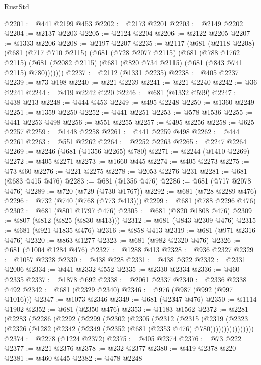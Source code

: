 \begin{lexlean}{RustStd}
\begin{coremodule}
{\begin{coremodule}
{{{{{{{{{{{{{{{{{{{{{{{{{{@2201 := @441 @2199 @453
@2202 := @2173 @2201
@2203 := @2149 @2202
@2204 := @2137 @2203
@2205 := @2124 @2204
@2206 := @2122 @2205
@2207 := @1333 @2206
@2208 := @2197 @2207
@2235 := @2117
    (@681
      (@2118 @2208)
      (@681
        (@717 @710 @2115)
        (@681
          (@728 @2077 @2115)
          (@681
            (@788 @1762 @2115)
            (@681 (@2082 @2115) (@681 (@820 @734 @2115) (@681 (@843 @741 @2115) @780)))))))
@2237 := @2112 (@1331 @2235)
@2238 := @405 @2237
@2239 := @73 @198
@2240 := @221 @2239
@2241 := @221 @2240
@2242 := @36 @2241
@2244 := @419 @2242 @220
@2246 := @681 (@1332 @599)
@2247 := @438 @213
@2248 := @444 @453
@2249 := @495 @2248
@2250 := @1360 @2249
@2251 := @1359 @2250
@2252 := @441 @2251
@2253 := @578 @1536
@2255 := @441 @2253 @498
@2256 := @551 @2255
@2257 := @495 @2256
@2258 := @625 @2257
@2259 := @1448 @2258
@2261 := @441 @2259 @498
@2262 := @444 @2261
@2263 := @551 @2262
@2264 := @2252 @2263
@2265 := @2247 @2264
@2269 := @2246 (@681 (@1356 @2265) @780)
@2271 := @2244 (@1410 @2269)
@2272 := @405 @2271
@2273 := @1660 @445
@2274 := @405 @2273
@2275 := @73 @60
@2276 := @221 @2275
@2278 := @2053 @2276 @231
@2281 := @681 (@683 @415 @476)
@2283 := @681 (@1356 @476)
@2286 := @681 (@717 @2078 @476)
@2289 := @720 (@729 (@730 @1767))
@2292 := @681 (@728 @2289 @476)
@2296 := @732 (@740 (@768 (@773 @413)))
@2299 := @681 (@788 @2296 @476)
@2302 := @681 (@801 @1797 @476)
@2305 := @681 (@820 @1808 @476)
@2309 := @807 (@812 (@825 (@830 @413)))
@2312 := @681 (@843 @2309 @476)
@2315 := @681 (@921 @1835 @476)
@2316 := @858 @413
@2319 := @681 (@971 @2316 @476)
@2320 := @863 @1277
@2323 := @681 (@982 @2320 @476)
@2326 := @681 (@1004 @1284 @476)
@2327 := @1288 @413
@2328 := @936 @2327
@2329 := @1057 @2328
@2330 := @438 @228
@2331 := @438 @322
@2332 := @2331 @2006
@2334 := @441 @2332 @552
@2335 := @2330 @2334
@2336 := @460 @2335
@2337 := @1878 @692
@2338 := @2061 @2337
@2340 := @2336 @2338 @492
@2342 := @681 (@2329 @2340)
@2346 := @976 (@987 (@992 (@997 @1016)))
@2347 := @1073 @2346
@2349 := @681 (@2347 @476)
@2350 := @1114 @1902
@2352 := @681 (@2350 @476)
@2353 := @1183 @1562
@2372 := @2281
    (@2283
      (@2286
        (@2292
          (@2299
            (@2302
              (@2305
                (@2312
                  (@2315
                    (@2319
                      (@2323
                        (@2326 (@1282 (@2342 (@2349 (@2352 (@681 (@2353 @476) @780))))))))))))))))
@2374 := @2278 (@1224 @2372)
@2375 := @405 @2374
@2376 := @73 @222
@2377 := @221 @2376
@2378 := @232 @2377
@2380 := @419 @2378 @220
@2381 := @460 @445
@2382 := @478 @2248
}}}}}}}}}}}}}}}}}}}}}}}}}}
\end{coremodule}}
\end{coremodule}
\end{lexlean}
